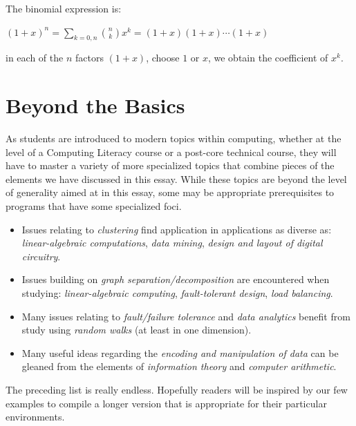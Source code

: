 The binomial expression is:

$(1+x)^n = \sum_{k=0,n} {n \choose k} x^k = (1+x)(1+x)\cdots(1+x)$

in each of the $n$ factors $(1+x)$, choose $1$ or $x$, we obtain the coefficient of $x^k$.

\medskip




\section{Beyond the Basics}

As students are introduced to modern topics within computing, whether
at the level of a Computing Literacy course or a post-core technical
course, they will have to master a variety of more specialized topics
that combine pieces of the elements we have discussed in this essay.
While these topics are beyond the level of generality aimed at in this
essay, some may be appropriate prerequisites to programs that have
some specialized foci.
\begin{itemize}
\item
Issues relating to {\em clustering} find application in applications as
diverse as: {\em linear-algebraic computations}, {\em data mining},
{\em design and layout of digital circuitry}.

\item
Issues building on {\em graph separation/decomposition} are
encountered when studying: {\em linear-algebraic computing}, {\em
  fault-tolerant design}, {\em load balancing}.

\item
Many issues relating to {\em fault/failure tolerance} and {\em data
  analytics} benefit from study using {\em random walks} (at least in
one dimension).

\item
Many useful ideas regarding the {\em encoding and manipulation of
  data} can be gleaned from the elements of {\em information theory}
and {\em computer arithmetic}.
\end{itemize}
The preceding list is really endless.  Hopefully readers will be
inspired by our few examples to compile a longer version that is
appropriate for their particular environments.

